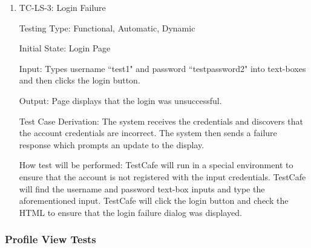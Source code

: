 \documentclass[12pt, titlepage]{article}
\begin{document}
\begin{enumerate}
\item {TC-LS-3: Login Failure}
    
Testing Type: Functional, Automatic, Dynamic
					
Initial State: Login Page
					
Input: Types username ``test1" and password ``testpassword2" into text-boxes and then clicks the login button.
					
Output: Page displays that the login was unsuccessful.

Test Case Derivation: The system receives the credentials and discovers that the account credentials are incorrect. The system then sends a failure response which prompts an update to the display.
					
How test will be performed: TestCafe will run in a special environment to ensure that the account is not registered with the input credentials. TestCafe will find the username and password text-box inputs and type the aforementioned input. TestCafe will click the login button and check the HTML to ensure that the login failure dialog was displayed.
\end{enumerate}


\subsubsection{Profile View Tests}

\end{document}
